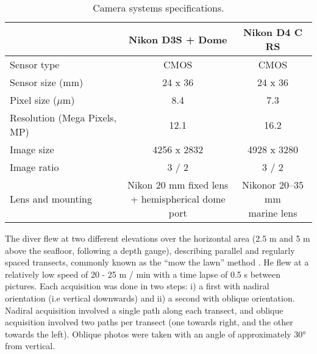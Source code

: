 \begin{table}[H]
  \centering
  \normalsize
  \caption{Camera systems specifications.}
  \label{table1.1}
    \begin{tabular}{lcc} %
        \toprule
        \textbf{}	& \textbf{Nikon D3S + Dome}	& \textbf{Nikon D4 C RS}\\
        \midrule
        Sensor type		& CMOS			& CMOS\\
        Sensor size (mm)		& 24 x 36			& 24 x 36\\
        Pixel size ($\mu$m)     & 8.4       & 7.3\\
        Resolution (Mega Pixels, MP)		& 12.1			& 16.2\\
        Image size		& 4256 x 2832			& 4928 x 3280\\
        Image ratio		& 3 / 2			& 3 / 2\\
        Lens and mounting		& \makecell[c]{Nikon 20 mm fixed lens \\ + hemispherical
        dome port}			& \makecell[c]{Nikonor 20–35 mm \\ marine lens}\\
        \bottomrule
    \end{tabular}
\end{table}

The diver flew at two different elevations over the horizontal area (2.5 m and 5 m above the seafloor, following a depth gauge), describing parallel and regularly spaced transects, commonly known as the “mow the lawn” method \citep{pizarro_simple_2017}. He flew at a relatively low speed of 20 - 25 m / min with a time lapse of 0.5 s between pictures. Each acquisition was done in two steps: i) a first with nadiral orientation (i.e vertical downwards) and ii) a second with oblique orientation. Nadiral acquisition involved a single path along each transect, and oblique acquisition involved two paths per transect (one towards right, and the other towards the left). Oblique photos were taken with an angle of approximately 30° from vertical.

